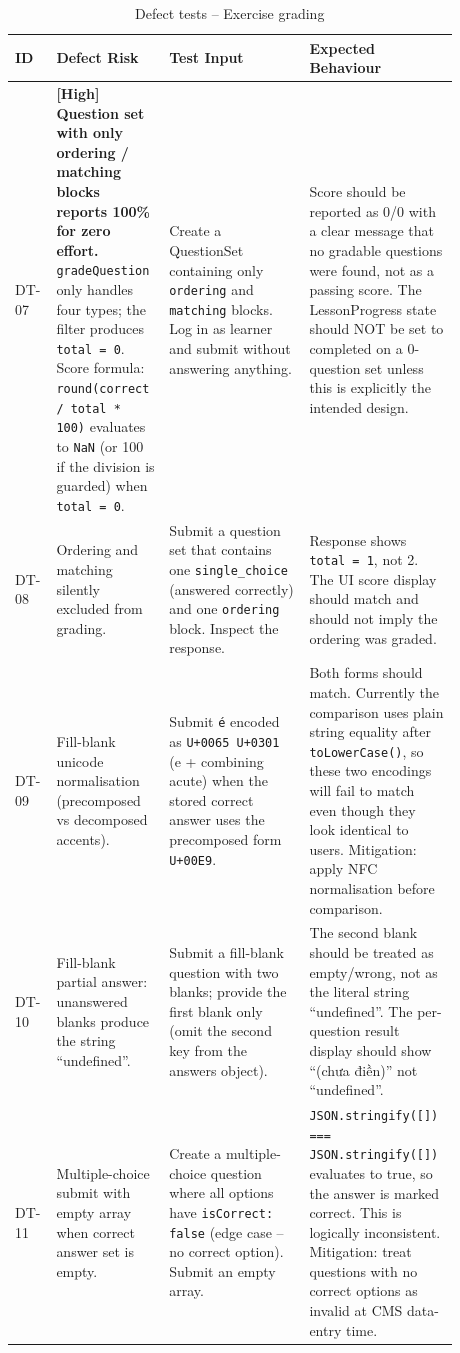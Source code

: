 \begin{longtable}{p{0.08\linewidth} p{0.24\linewidth} p{0.30\linewidth} p{0.26\linewidth}}
\caption{Defect tests -- Exercise grading}\\
\toprule
ID & Defect Risk & Test Input & Expected Behaviour \\
\midrule
\endhead
DT-07 & \textbf{[High] Question set with only ordering / matching blocks reports 100\% for zero effort.} \texttt{gradeQuestion} only handles four types; the filter produces \texttt{total = 0}. Score formula: \texttt{round(correct / total * 100)} evaluates to \texttt{NaN} (or 100 if the division is guarded) when \texttt{total = 0}. & Create a QuestionSet containing only \texttt{ordering} and \texttt{matching} blocks. Log in as learner and submit without answering anything. & Score should be reported as 0/0 with a clear message that no gradable questions were found, not as a passing score. The LessonProgress state should NOT be set to completed on a 0-question set unless this is explicitly the intended design. \\
DT-08 & Ordering and matching silently excluded from grading. & Submit a question set that contains one \texttt{single\_choice} (answered correctly) and one \texttt{ordering} block. Inspect the response. & Response shows \texttt{total = 1}, not 2. The UI score display should match and should not imply the ordering was graded. \\
DT-09 & Fill-blank unicode normalisation (precomposed vs decomposed accents). & Submit \texttt{é} encoded as \texttt{U+0065 U+0301} (e + combining acute) when the stored correct answer uses the precomposed form \texttt{U+00E9}. & Both forms should match. Currently the comparison uses plain string equality after \texttt{toLowerCase()}, so these two encodings will fail to match even though they look identical to users. Mitigation: apply NFC normalisation before comparison. \\
DT-10 & Fill-blank partial answer: unanswered blanks produce the string ``undefined''. & Submit a fill-blank question with two blanks; provide the first blank only (omit the second key from the answers object). & The second blank should be treated as empty/wrong, not as the literal string ``undefined''. The per-question result display should show ``(chưa điền)'' not ``undefined''. \\
DT-11 & Multiple-choice submit with empty array when correct answer set is empty. & Create a multiple-choice question where all options have \texttt{isCorrect: false} (edge case -- no correct option). Submit an empty array. & \texttt{JSON.stringify([]) === JSON.stringify([])} evaluates to true, so the answer is marked correct. This is logically inconsistent. Mitigation: treat questions with no correct options as invalid at CMS data-entry time. \\

\end{longtable}
